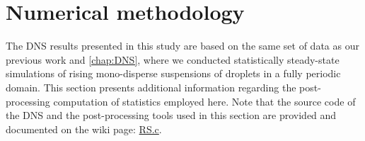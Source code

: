 \section{Numerical methodology}
\label{sec:methodo2}

The DNS results presented in this study are based on the same set of data as our previous work \citet{fintzi2024buoyancy} and \ref{chap:DNS}, where we conducted statistically steady-state simulations of rising mono-disperse suspensions of droplets in a fully periodic domain. 
This section 
presents additional information regarding the post-processing computation of statistics employed here. 
Note that the source code of the DNS and the post-processing tools used in this section are provided and documented on the wiki page: \href{http://basilisk.fr/sandbox/fintzin/Rising-suspension/RS.c}{RS.c}. 





